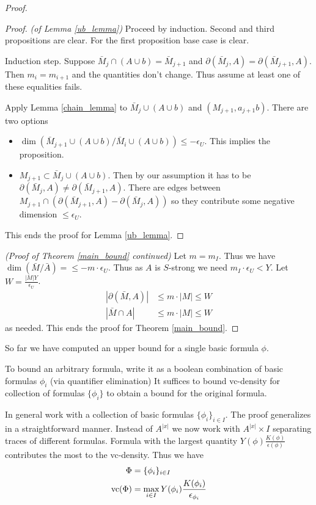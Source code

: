 \documentclass{amsart}
\begin{document}
\begin{proof}
	\begin{proof} \textit{(of Lemma \ref{ub_lemma})}
		Proceed by induction.
		Second and third propositions are clear.
		For the first proposition base case is clear.
		
		Induction step.
		Suppose $\bar M_j \cap (A \cup b) = \bar M_{j+1}$ and $\partial(\bar M_j, A) = \partial(\bar M_{j+1}, A)$.
		Then $m_i = m_{i+1}$ and the quantities don't change.
		Thus assume at least one of these equalities fails.
		
		Apply Lemma \ref{chain_lemma} to $\bar M_j \cup (A \cup b)$ and $(M_{j+1}, a_{j+1}b)$.
		There are two options
		
		\begin{itemize}
			\item $\dim(\bar M_{j+1} \cup (A \cup b) / \bar M_i \cup (A \cup b)) \leq -\epsilon_U$.
			This implies the proposition.
			\item $M_{j+1} \subset \bar M_j \cup (A \cup b)$.
			Then by our assumption it has to be $\partial(\bar M_j, A) \neq \partial(\bar M_{j+1}, A)$.
			There are edges between $M_{j+1} \cap (\partial(\bar M_{j+1}, A) - \partial(\bar M_j, A))$ so they contribute some negative dimension $\leq \epsilon_U$.
		\end{itemize}
		This ends the proof for Lemma \ref{ub_lemma}.
	\end{proof}
	\textit{(Proof of Theorem \ref{main_bound} continued)}
	Let $m = m_I$.
	Thus we have $\dim(\bar M / \bar A) = \leq -m \cdot \epsilon_U $.
	Thus as $A$ is $S$-strong we need $m_I \cdot \epsilon_U < Y$.
	Let $W = \frac{|M|Y}{\epsilon_U}$.
	\begin{align*}
		|\partial(\bar M, A)| &\leq m \cdot |M| \leq W \\
		|\bar M \cap A| &\leq m \cdot |M| \leq W
	\end{align*}
	as needed.
	This ends the proof for Theorem \ref{main_bound}.
\end{proof}

So far we have computed an upper bound for a single basic formula $\phi$.

To bound an arbitrary formula, write it as a boolean combination of basic formulas $\phi_i$ (via quantifier elimination)
It suffices to bound vc-density for collection of formulas $\{\phi_i\}$ to obtain a bound for the original formula.

In general work with a collection of basic formulas $\{\phi_i\}_{i \in I}$.
The proof generalizes in a straightforward manner.
Instead of $A^{|x|}$ we now work with $A^{|x|} \times I$ separating traces of different formulas.
Formula with the largest quantity $Y(\phi)\frac{K(\phi)}{\epsilon(\phi)}$ contributes the most to the vc-density.
Thus we have
\begin{align*}
	\Phi &= \{\phi_i\}_{i \in I} \\
	\operatorname{vc}(\Phi) &=  \max_{i \in I} Y(\phi_i) \frac{K(\phi_i)}{\epsilon_{\phi_i}}
\end{align*}
\end{document}
